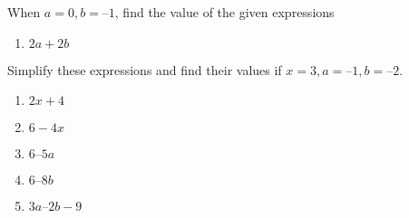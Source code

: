 When $a = 0, b = – 1$, find the value of the given expressions
\begin{enumerate}[label=\thesubsection.\arabic*, ref=\thesubsection.\theenumi,resume*]
\item $2a + 2b$
\end{enumerate}
Simplify these expressions and find their values if $x = 3, a = – 1, b = – 2$. 
	\begin{multicols}{4}
\begin{enumerate}[label=\thesubsection.\arabic*, ref=\thesubsection.\theenumi,resume*]
\item $ 2x +4 $
\item $6 - 4x$
\item $6 – 5a $
\item $6 – 8b $
\item $3a – 2b-9 $
\end{enumerate}
\end{multicols}
